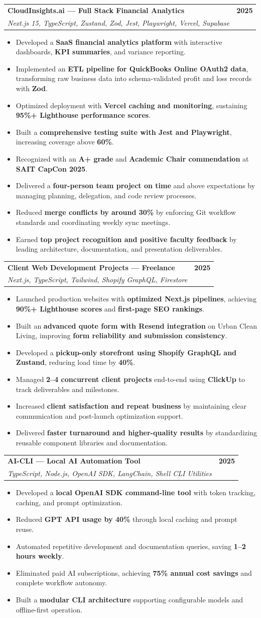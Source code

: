 \documentclass[letterpaper,11pt]{article}
\makeatletter
\newcommand{\resumeItem}[1]{\item\small{#1}}
\newcommand{\resumeSubheading}[4]{
  \vspace{-2pt}\item
  \begin{tabular*}{0.97\textwidth}[t]{l@{\extracolsep{\fill}}r}
    \textbf{#1} & #2 \\
    \textit{\small#3} & \textit{\small #4} \\
  \end{tabular*}\vspace{-7pt}
}
\newcommand{\resumeItemListStart}{\begin{itemize}[leftmargin=0.3in]}
\newcommand{\resumeItemListEnd}{\end{itemize}}
\makeatother
\begin{document}
\resumeSubheading
  {\textbf{CloudInsights.ai — Full Stack Financial Analytics}}{\textbf{2025}}
  {Next.js 15, TypeScript, Zustand, Zod, Jest, Playwright, Vercel, Supabase}{}
  \resumeItemListStart
    \resumeItem{Developed a \textbf{SaaS financial analytics platform} with interactive dashboards, \textbf{KPI summaries}, and variance reporting.}
    \resumeItem{Implemented an \textbf{ETL pipeline for QuickBooks Online OAuth2 data}, transforming raw business data into schema-validated profit and loss records with \textbf{Zod}.}
    \resumeItem{Optimized deployment with \textbf{Vercel caching and monitoring}, sustaining \textbf{95\%+ Lighthouse performance scores}.}
    \resumeItem{Built a \textbf{comprehensive testing suite with Jest and Playwright}, increasing coverage above \textbf{60\%}.}
    \resumeItem{Recognized with an \textbf{A+ grade} and \textbf{Academic Chair commendation} at \textbf{SAIT CapCon 2025}.}
    \resumeItem{Delivered a \textbf{four-person team project on time} and above expectations by managing planning, delegation, and code review processes.}
    \resumeItem{Reduced \textbf{merge conflicts by around 30\%} by enforcing Git workflow standards and coordinating weekly sync meetings.}
    \resumeItem{Earned \textbf{top project recognition and positive faculty feedback} by leading architecture, documentation, and presentation deliverables.}
  \resumeItemListEnd

\resumeSubheading
  {\textbf{Client Web Development Projects — Freelance}}{\textbf{2025}}
  {Next.js, TypeScript, Tailwind, Shopify GraphQL, Firestore}{}
  \resumeItemListStart
    \resumeItem{Launched production websites with \textbf{optimized Next.js pipelines}, achieving \textbf{90\%+ Lighthouse scores} and \textbf{first-page SEO rankings}.}
    \resumeItem{Built an \textbf{advanced quote form with Resend integration} on Urban Clean Living, improving \textbf{form reliability and submission consistency}.}
    \resumeItem{Developed a \textbf{pickup-only storefront using Shopify GraphQL and Zustand}, reducing load time by \textbf{40\%}.}
    \resumeItem{Managed \textbf{2–4 concurrent client projects} end-to-end using \textbf{ClickUp} to track deliverables and milestones.}
    \resumeItem{Increased \textbf{client satisfaction and repeat business} by maintaining clear communication and post-launch optimization support.}
    \resumeItem{Delivered \textbf{faster turnaround and higher-quality results} by standardizing reusable component libraries and documentation.}
  \resumeItemListEnd

\resumeSubheading
  {\textbf{AI-CLI — Local AI Automation Tool}}{\textbf{2025}}
  {TypeScript, Node.js, OpenAI SDK, LangChain, Shell CLI Utilities}{}
  \resumeItemListStart
    \resumeItem{Developed a \textbf{local OpenAI SDK command-line tool} with token tracking, caching, and prompt optimization.}
    \resumeItem{Reduced \textbf{GPT API usage by 40\%} through local caching and prompt reuse.}
    \resumeItem{Automated repetitive development and documentation queries, saving \textbf{1–2 hours weekly}.}
    \resumeItem{Eliminated paid AI subscriptions, achieving \textbf{75\% annual cost savings} and complete workflow autonomy.}
    \resumeItem{Built a \textbf{modular CLI architecture} supporting configurable models and offline-first operation.}
  \resumeItemListEnd
\end{document}
